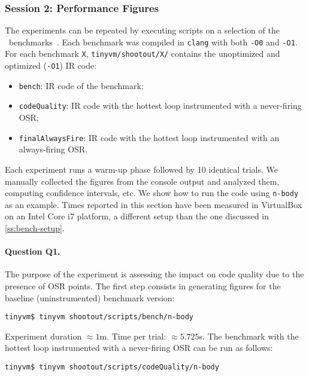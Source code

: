 
\subsubsection{Session 2: Performance Figures}

The experiments can be repeated by executing scripts on a selection of the \shootout\ benchmarks~\cite{shootout}. Each benchmark was compiled in {\tt clang} with both {\tt -O0} and {\tt -O1}. For each benchmark {\tt X}, {\tt tinyvm/shootout/X/} contains the unoptimized and optimized ({\tt -O1}) IR code:

\begin{itemize}[parsep=0pt]
\item {\tt bench}: IR code of the benchmark;
\item {\tt codeQuality}: IR code with the hottest loop instrumented with a never-firing OSR;
\item {\tt finalAlwaysFire}: IR code with the hottest loop instrumented with an always-firing OSR.
\end{itemize}

\noindent Each experiment runs a warm-up phase followed by 10 identical trials. We manually collected the figures from the console output and analyzed them, computing confidence intervals, etc. We show how to run the code using {\tt n-body} as an example. Times reported in this section have been measured in VirtualBox on an Intel Core i7 platform, a different setup than the one discussed in \ref{ss:bench-setup}.

\paragraph{Question Q1.} The purpose of the experiment is assessing the impact on code quality due to the presence of OSR points.
The first step consists in generating figures for the baseline (uninstrumented) benchmark version:
\begin{small}
\begin{verbatim}
tinyvm$ tinyvm shootout/scripts/bench/n-body
\end{verbatim}
\end{small}

\noindent Experiment duration $\approx1$m. Time per trial: $\approx5.725$s. The benchmark with the hottest loop instrumented with a never-firing OSR can be run as follows:

\begin{small}
\begin{verbatim}
tinyvm$ tinyvm shootout/scripts/codeQuality/n-body
\end{verbatim}
\end{small}

